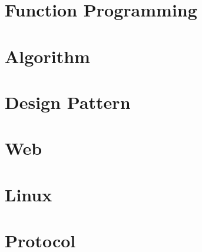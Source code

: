\documentclass[12pt, oneside, b5paper]{book}
\begin{document}
\part{Function Programming}



\part{Algorithm}


\part{Design Pattern}


\part{Web}






\part{Linux}






\part{Protocol}


		
\newpage
\end{document}
